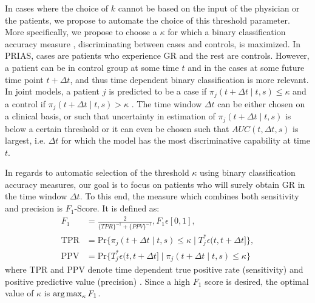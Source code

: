 In cases where the choice of $k$ cannot be based on the input of the physician or the patients, we propose to automate the choice of this threshold parameter. More specifically, we propose to choose a $\kappa$ for which a binary classification accuracy measure \citep{lopez2014optimalcutpoints,sokolova2009systematic}, discriminating between cases and controls, is maximized. In PRIAS, cases are patients who experience GR and the rest are controls. However, a patient can be in control group at some time $t$ and in the cases at some future time point $t + \Delta t$, and thus time dependent binary classification is more relevant. In joint models, a patient $j$ is predicted to be a case if $\pi_j(t + \Delta t \mid t,s) \leq \kappa$ and a control if $\pi_j(t + \Delta t \mid t,s) > \kappa$ \citep{rizopoulosJMbayes}. The time window $\Delta t$ can be either chosen on a clinical basis, or such that uncertainty in estimation of $\pi_j(t + \Delta t \mid t,s)$ is below a certain threshold or it can even be chosen such that $AUC(t, \Delta t, s)$ \citep{rizopoulosJMbayes} is largest, i.e. $\Delta t$ for which the model has the most discriminative capability at time $t$.

In regards to automatic selection of the threshold $\kappa$ using binary classification accuracy measures, our goal is to focus on patients who will surely obtain GR in the time window $\Delta t$. To this end, the measure which combines both sensitivity and precision is $F_1$-Score. It is defined as:
\begin{align*}
F_1 &= \frac{2}{\{TPR\}^{-1} + \{PPV\}^{-1}}, F_1 \epsilon [0,1],\\
\text{TPR} &= \mbox{Pr}\big\{\pi_j(t + \Delta t \mid t,s) \leq \kappa \mid T^*_j \epsilon (t, t + \Delta t]\big\},\\
\text{PPV} &= \mbox{Pr}\big\{T^*_j \epsilon (t, t + \Delta t] \mid \pi_j(t + \Delta t \mid t,s) \leq \kappa \big\}
\end{align*}
where TPR and PPV denote time dependent true positive rate (sensitivity) and positive predictive value (precision) \citep{rizopoulosJMbayes}. Since a high $F_1$ score is desired, the optimal value of $\kappa$ is $\operatorname{arg\,max}_{\kappa} F_1$.

